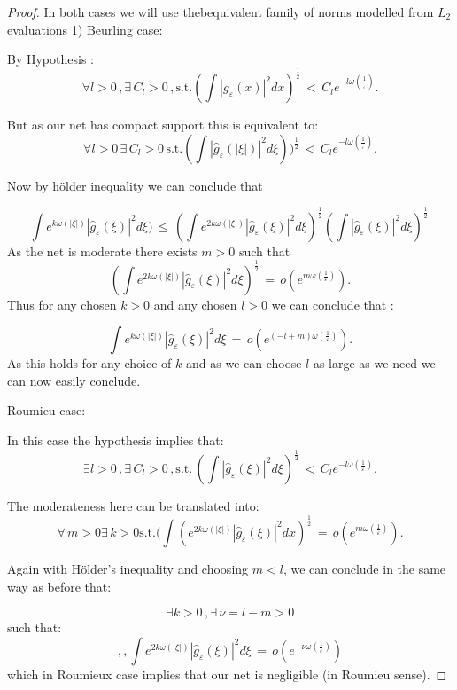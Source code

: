 \documentclass[12pt,a4paper]{amsart}
\begin{document}
 \begin{proof}
  In both cases we will use thebequivalent family of norms modelled from $L_2$ evaluations 
 1) Beurling case:
 
 By Hypothesis :
 $$\forall l>0\,,\exists\,C_l>0\,, \mbox{s.t.} 
 (\int |g_\varepsilon(x)|^2dx)^{\frac{1}{2}} \,
  <\,C_le^{-l\omega(\frac{1}{_\varepsilon})} .$$
 
 But as our net has compact support this is equivalent to:
 $$\forall l>0\,\exists\,C_l>0\,\mbox{s.t.} 
 (\int |\hat{g}_\varepsilon(|\xi|)|^2 d\xi))^{\frac{1}{2}} \,<\,C_le^{-l\omega(\frac{1}{_\varepsilon})}.$$
  
 Now by h\"{o}lder inequality we can conclude that 
 
 \begin{equation*}
\int e^{k\omega(|\xi|)}|\hat{g}_\varepsilon(\xi)|^2 d\xi) \,
  \leq \,(\int e^{2k\omega(|\xi|)}
  |\hat{g}_\varepsilon(\xi)|^2 d\xi)^{\frac{1}{2}}
 (\int |\hat{g}_\varepsilon(\xi)|^2 d\xi)^{\frac{1}{2}} \,
 \end{equation*}
 As the net is moderate there exists $m>0$ such that 
 $$( \int e^{2k\omega(|\xi|)} |\hat{g}_\varepsilon(\xi)|^2d\xi )^{\frac{1}{2}} \,=\,
 o(e^{m\omega(\frac{1}{\varepsilon})}) .$$
 Thus for any chosen $k>0$ and any chosen $l>0$ we can conclude that :
 
 $$ \int e^{k\omega(|\xi|)}|\hat{g}_\varepsilon(\xi)|^2 d\xi
 \,=\,o(e^{(-l+m)\omega(\frac{1}{\varepsilon})}) .$$
 As this holds for any choice of $k$ and as we can choose $l$ as large as we need we can now easily conclude.
 
  Roumieu case:
  
  In this case the hypothesis implies that: 
  \begin{equation*}
 \exists  l>0\,,\exists\,C_l>0\,,\mbox{s.t.} \,
(\int |\hat{g}_{\varepsilon}(\xi)|^2 d\xi)^{\frac{1}{2}} \,
  <\,C_le^{-l\omega(\frac{1}{\varepsilon})}.
  \end{equation*} 
  
  
  
  
   The moderateness here can be translated into:
   \begin{equation*} 
  \forall \,m>0 \exists \,k>0 \mbox{s.t}.
 (\int (e^{2k\omega(|\xi|)}|\hat{g}_\varepsilon(\xi)|^2dx)^{\frac{1}{2}} \,=\,
 o(e^{m\omega(\frac{1}{\varepsilon})}) .
 \end{equation*}
 
 
 Again with H\"{o}lder's inequality and choosing $m <l$, we can conclude in the same way as before that:
 
 $$ \exists k>0\,,\exists\, \nu = l-m>0$$
 such that:
 $$ ,,\int e^{2k\omega(|\xi|)}|\hat{g}_\varepsilon(\xi)|^2d\xi
 \,=\,o(e^{-\nu\omega(\frac{1}{\varepsilon})})$$
 which in Roumieux case implies that our net is negligible (in Roumieu sense).
 \end{proof}
  
\end{document}
